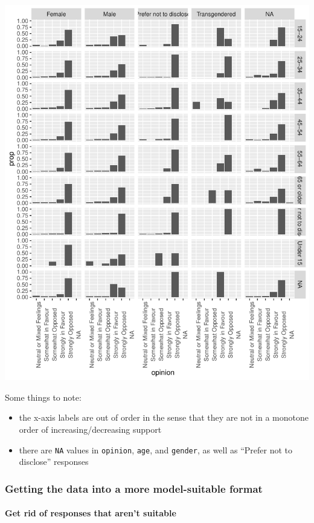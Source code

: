 \documentclass[
]{book}
\providecommand{\tightlist}{%
  \setlength{\itemsep}{0pt}\setlength{\parskip}{0pt}}
\begin{document}
\includegraphics{telling_stories_with_data_files/figure-latex/unnamed-chunk-280-1.pdf}

Some things to note:

\begin{itemize}
\tightlist
\item
  the x-axis labels are out of order in the sense that they are not in a monotone order of increasing/decreasing support
\item
  there are \texttt{NA} values in \texttt{opinion}, \texttt{age}, and \texttt{gender}, as well as ``Prefer not to disclose'' responses
\end{itemize}

\hypertarget{getting-the-data-into-a-more-model-suitable-format}{%
\subsubsection{Getting the data into a more model-suitable format}\label{getting-the-data-into-a-more-model-suitable-format}}

\hypertarget{get-rid-of-responses-that-arent-suitable}{%
\paragraph{Get rid of responses that aren't suitable}\label{get-rid-of-responses-that-arent-suitable}}
\end{document}
